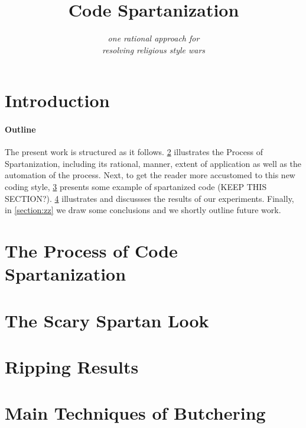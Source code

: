 \documentclass[preprint,10pt,nonatbib]{sigplanconf}
\title{Code Spartanization}
\subtitle{\scriptsize \emph{one rational approach for\\ resolving religious style wars}}
\begin{document}
\maketitle

\def\ignore#1{}
\def\gal{\marginpar[G$\Rightarrow$]{$\Leftarrow$G}}
\def\yossi{\marginpar[Y$\Rightarrow$]{$\Leftarrow$Y}}
\def\matteo{\marginpar[M$\Rightarrow$]{$\Leftarrow$M}}

\begin{abstract}
  
\end{abstract}

\section{Introduction}


\paragraph{Outline}
The present work is structured as it follows.
\cref{section:principia} illustrates the Process of Spartanization, 
including its rational, manner, extent of application as well as
the automation of the process. 
Next, to get the reader more accustomed to this new coding style, 
\cref{section:look} presents some example of spartanized code (KEEP THIS SECTION?).
\cref{section:initial} illustrates and discussses 
the results of our experiments.
Finally, in \cref{section:zz} we draw some conclusions and we shortly
outline future work.

\section{The Process of Code Spartanization}
\label{section:principia}


\section{The Scary Spartan Look}
\label{section:look}


\section{Ripping Results}
\label{section:initial}


\label{section:zz}


\balance
\small


\appendix
\section{Main Techniques of Butchering}
\label{section:techniques}

\end{document}
